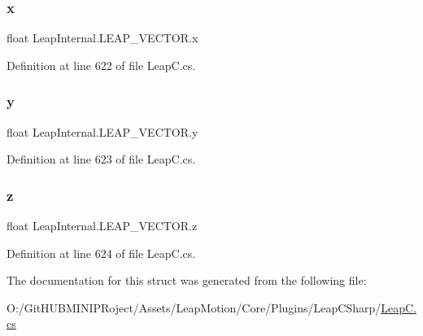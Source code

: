 \subsubsection{\texorpdfstring{x}{x}}
{\footnotesize\ttfamily float Leap\+Internal.\+L\+E\+A\+P\+\_\+\+V\+E\+C\+T\+O\+R.\+x}



Definition at line 622 of file Leap\+C.\+cs.

\mbox{\label{struct_leap_internal_1_1_l_e_a_p___v_e_c_t_o_r_a590c426ffd4e8ade9475dba1e85433dd}} 
\subsubsection{\texorpdfstring{y}{y}}
{\footnotesize\ttfamily float Leap\+Internal.\+L\+E\+A\+P\+\_\+\+V\+E\+C\+T\+O\+R.\+y}



Definition at line 623 of file Leap\+C.\+cs.

\mbox{\label{struct_leap_internal_1_1_l_e_a_p___v_e_c_t_o_r_af1fc4bf9c27138af9d077175709c68ef}} 
\subsubsection{\texorpdfstring{z}{z}}
{\footnotesize\ttfamily float Leap\+Internal.\+L\+E\+A\+P\+\_\+\+V\+E\+C\+T\+O\+R.\+z}



Definition at line 624 of file Leap\+C.\+cs.



The documentation for this struct was generated from the following file\+:\begin{DoxyCompactItemize}
\item 
O\+:/\+Git\+H\+U\+B\+M\+I\+N\+I\+P\+Roject/\+Assets/\+Leap\+Motion/\+Core/\+Plugins/\+Leap\+C\+Sharp/\mbox{\hyperlink{_leap_c_8cs}{Leap\+C.\+cs}}\end{DoxyCompactItemize}
